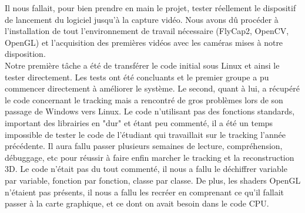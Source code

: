 Il nous fallait, pour bien prendre en main le projet, tester réellement le dispositif de lancement du logiciel jusqu'à la capture vidéo. Nous avons dû  procéder à l'installation de tout l'environnement de travail nécessaire (FlyCap2, OpenCV, OpenGL) et l’acquisition des premières vidéos avec les caméras mises à notre disposition. \\

Notre première tâche a été de transférer le code initial sous Linux et ainsi le tester directement. Les tests ont été concluants et le premier groupe a pu commencer directement à améliorer le système. Le second, quant à lui, a récupéré le code concernant le tracking mais a rencontré de gros problèmes lors de son passage de Windows vers Linux.
Le code n'utilisant pas des fonctions standards, important des librairies en "dur" et étant peu commenté, il a été un temps impossible de tester le code de l'étudiant qui travaillait sur le tracking l'année précédente. Il aura fallu passer plusieurs semaines de lecture, compréhension, débuggage, etc pour réussir à faire enfin marcher le tracking et la reconstruction 3D. Le code n'était pas du tout commenté, il nous a fallu le déchiffrer variable par variable, fonction par fonction, classe par classe. De plus, les shaders OpenGL n'étaient pas présents, il nous a fallu les recréer en comprenant ce qu'il fallait passer à la carte graphique, et ce dont on avait besoin dans le code CPU.
